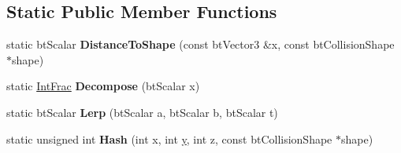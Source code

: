 \subsection*{Static Public Member Functions}
\begin{DoxyCompactItemize}
\item 
\hypertarget{structbt_sparse_sdf_a5bb4cb1c91f3f7a94f8924a87526c18c}{static bt\+Scalar {\bfseries Distance\+To\+Shape} (const bt\+Vector3 \&x, const bt\+Collision\+Shape $\ast$shape)}\label{structbt_sparse_sdf_a5bb4cb1c91f3f7a94f8924a87526c18c}

\item 
\hypertarget{structbt_sparse_sdf_a2f1d693d445c2d3c9cebe86f1fc440a6}{static \hyperlink{structbt_sparse_sdf_1_1_int_frac}{Int\+Frac} {\bfseries Decompose} (bt\+Scalar x)}\label{structbt_sparse_sdf_a2f1d693d445c2d3c9cebe86f1fc440a6}

\item 
\hypertarget{structbt_sparse_sdf_acf8197387b8c7737dab9e79d40aa2355}{static bt\+Scalar {\bfseries Lerp} (bt\+Scalar a, bt\+Scalar b, bt\+Scalar t)}\label{structbt_sparse_sdf_acf8197387b8c7737dab9e79d40aa2355}

\item 
\hypertarget{structbt_sparse_sdf_ad1595c6fc8c7913b34d81d53af508656}{static unsigned int {\bfseries Hash} (int x, int \hyperlink{_ice_utils_8h_aa7ffaed69623192258fb8679569ff9ba}{y}, int z, const bt\+Collision\+Shape $\ast$shape)}\label{structbt_sparse_sdf_ad1595c6fc8c7913b34d81d53af508656}

\end{DoxyCompactItemize}
